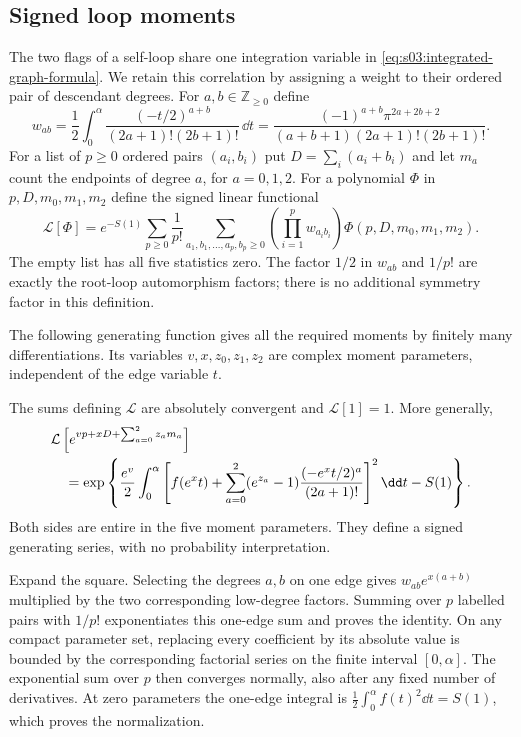 \subsection{Signed loop moments}
\label{subsec:a:02}

The two flags of a self-loop share one integration variable in
\eqref{eq:s03:integrated-graph-formula}. We retain this correlation by
assigning a weight to their ordered pair of descendant degrees. For
$a,b\in\mathbb Z_{\geq0}$ define
\begin{equation}\label{eq:a:paired-weight}
 w_{ab}=\frac12\int_0^{\alpha}
       \frac{(-t/2)^{a+b}}{(2a+1)!(2b+1)!}\,\dd t
 =\frac{(-1)^{a+b}\pi^{2a+2b+2}}
 {(a+b+1)(2a+1)!(2b+1)!}.
\end{equation}
For a list of $p\geq0$ ordered pairs $(a_i,b_i)$ put
$D=\sum_i(a_i+b_i)$ and let $m_a$ count the endpoints of degree $a$,
for $a=0,1,2$. For a polynomial $\Phi$ in $p,D,m_0,m_1,m_2$ define
the signed linear functional
\begin{equation}\label{eq:a:signed-functional}
 \mathcal L[\Phi]=e^{-S(1)}\sum_{p\geq0}\frac1{p!}
 \sum_{a_1,b_1,\ldots,a_p,b_p\geq0}
       \left(\prod_{i=1}^p w_{a_i b_i}\right)
       \Phi(p,D,m_0,m_1,m_2).
\end{equation}
The empty list has all five statistics zero. The factor $1/2$ in
$w_{ab}$ and $1/p!$ are exactly the root-loop automorphism factors;
there is no additional symmetry factor in this definition.

The following generating function gives all the required moments by
finitely many differentiations. Its variables $v,x,z_0,z_1,z_2$ are
complex moment parameters, independent of the edge variable $t$.

\begin{lmm}\label{lmm:a:joint-moments}
The sums defining $\mathcal L$ are absolutely convergent and
$\mathcal L[1]=1$. More generally,
\begin{align}
 &\mathcal L\left[e^{vp+xD+\sum_{a=0}^2z_a m_a}\right]\notag\\
 &\quad=\exp\left\{\frac{e^v}{2}\int_0^\alpha
 \left[f(e^x t)+\sum_{a=0}^2(e^{z_a}-1)
               \frac{(-e^x t/2)^a}{(2a+1)!}\right]^2\dd t-S(1)\right\}.
 \label{eq:a:joint-egf}
\end{align}
Both sides are entire in the five moment parameters. They define a
signed generating series, with no probability interpretation.
\end{lmm}
\begin{prf}
Expand the square. Selecting the degrees $a,b$ on one edge gives
$w_{ab}e^{x(a+b)}$ multiplied by the two corresponding low-degree
factors. Summing over $p$ labelled pairs with $1/p!$ exponentiates
this one-edge sum and proves the identity. On any compact parameter
set, replacing every coefficient by its absolute value is bounded by
the corresponding factorial series on the finite interval
$[0,\alpha]$. The exponential sum over $p$ then converges normally,
also after any fixed number of derivatives. At zero parameters the
one-edge integral is $\tfrac12\int_0^\alpha f(t)^2\dd t=S(1)$,
which proves the normalization.
\end{prf}

